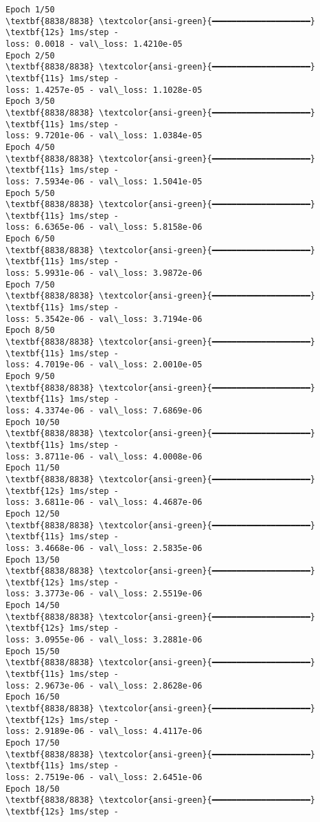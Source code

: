 \documentclass[11pt]{article}
\begin{document}
    \begin{Verbatim}[commandchars=\\\{\}]
Epoch 1/50
\textbf{8838/8838} \textcolor{ansi-green}{━━━━━━━━━━━━━━━━━━━━} \textbf{12s} 1ms/step -
loss: 0.0018 - val\_loss: 1.4210e-05
Epoch 2/50
\textbf{8838/8838} \textcolor{ansi-green}{━━━━━━━━━━━━━━━━━━━━} \textbf{11s} 1ms/step -
loss: 1.4257e-05 - val\_loss: 1.1028e-05
Epoch 3/50
\textbf{8838/8838} \textcolor{ansi-green}{━━━━━━━━━━━━━━━━━━━━} \textbf{11s} 1ms/step -
loss: 9.7201e-06 - val\_loss: 1.0384e-05
Epoch 4/50
\textbf{8838/8838} \textcolor{ansi-green}{━━━━━━━━━━━━━━━━━━━━} \textbf{11s} 1ms/step -
loss: 7.5934e-06 - val\_loss: 1.5041e-05
Epoch 5/50
\textbf{8838/8838} \textcolor{ansi-green}{━━━━━━━━━━━━━━━━━━━━} \textbf{11s} 1ms/step -
loss: 6.6365e-06 - val\_loss: 5.8158e-06
Epoch 6/50
\textbf{8838/8838} \textcolor{ansi-green}{━━━━━━━━━━━━━━━━━━━━} \textbf{11s} 1ms/step -
loss: 5.9931e-06 - val\_loss: 3.9872e-06
Epoch 7/50
\textbf{8838/8838} \textcolor{ansi-green}{━━━━━━━━━━━━━━━━━━━━} \textbf{11s} 1ms/step -
loss: 5.3542e-06 - val\_loss: 3.7194e-06
Epoch 8/50
\textbf{8838/8838} \textcolor{ansi-green}{━━━━━━━━━━━━━━━━━━━━} \textbf{11s} 1ms/step -
loss: 4.7019e-06 - val\_loss: 2.0010e-05
Epoch 9/50
\textbf{8838/8838} \textcolor{ansi-green}{━━━━━━━━━━━━━━━━━━━━} \textbf{11s} 1ms/step -
loss: 4.3374e-06 - val\_loss: 7.6869e-06
Epoch 10/50
\textbf{8838/8838} \textcolor{ansi-green}{━━━━━━━━━━━━━━━━━━━━} \textbf{11s} 1ms/step -
loss: 3.8711e-06 - val\_loss: 4.0008e-06
Epoch 11/50
\textbf{8838/8838} \textcolor{ansi-green}{━━━━━━━━━━━━━━━━━━━━} \textbf{12s} 1ms/step -
loss: 3.6811e-06 - val\_loss: 4.4687e-06
Epoch 12/50
\textbf{8838/8838} \textcolor{ansi-green}{━━━━━━━━━━━━━━━━━━━━} \textbf{11s} 1ms/step -
loss: 3.4668e-06 - val\_loss: 2.5835e-06
Epoch 13/50
\textbf{8838/8838} \textcolor{ansi-green}{━━━━━━━━━━━━━━━━━━━━} \textbf{12s} 1ms/step -
loss: 3.3773e-06 - val\_loss: 2.5519e-06
Epoch 14/50
\textbf{8838/8838} \textcolor{ansi-green}{━━━━━━━━━━━━━━━━━━━━} \textbf{12s} 1ms/step -
loss: 3.0955e-06 - val\_loss: 3.2881e-06
Epoch 15/50
\textbf{8838/8838} \textcolor{ansi-green}{━━━━━━━━━━━━━━━━━━━━} \textbf{11s} 1ms/step -
loss: 2.9673e-06 - val\_loss: 2.8628e-06
Epoch 16/50
\textbf{8838/8838} \textcolor{ansi-green}{━━━━━━━━━━━━━━━━━━━━} \textbf{12s} 1ms/step -
loss: 2.9189e-06 - val\_loss: 4.4117e-06
Epoch 17/50
\textbf{8838/8838} \textcolor{ansi-green}{━━━━━━━━━━━━━━━━━━━━} \textbf{11s} 1ms/step -
loss: 2.7519e-06 - val\_loss: 2.6451e-06
Epoch 18/50
\textbf{8838/8838} \textcolor{ansi-green}{━━━━━━━━━━━━━━━━━━━━} \textbf{12s} 1ms/step -

\end{Verbatim}
\end{document}
